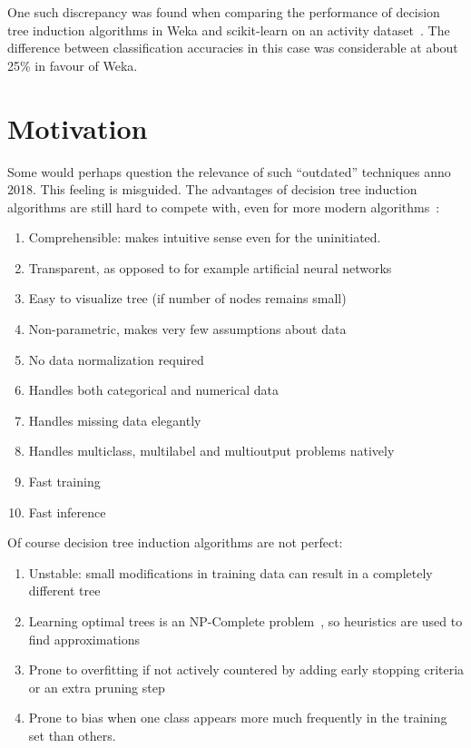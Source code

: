 One such discrepancy was found when comparing the performance of decision tree induction algorithms in Weka and scikit-learn on an activity dataset~\cite{problematic_dataset}. The difference between classification accuracies in this case was considerable at about 25\% in favour of Weka.

\section{Motivation}
Some would perhaps question the relevance of such ``outdated'' techniques anno 2018. This feeling is misguided. The advantages of decision tree induction algorithms are still hard to compete with, even for more modern algorithms~\cite{scikit-learn, murthy1998automatic, kotsiantis2007supervised}:

\begin{enumerate}
    \item Comprehensible: makes intuitive sense even for the uninitiated.
    \item Transparent, as opposed to for example artificial neural networks
    \item Easy to visualize tree (if number of nodes remains small)
    \item Non-parametric, makes very few assumptions about data
    \item No data normalization required
    \item Handles both categorical and numerical data
    \item Handles missing data elegantly %
    \item Handles multiclass, multilabel and multioutput problems natively
    \item Fast training
    \item Fast inference
\end{enumerate}

Of course decision tree induction algorithms are not perfect:
\begin{enumerate}
    \item Unstable: small modifications in training data can result in a completely different tree
    \item Learning optimal trees is an NP-Complete problem~\cite{npcomplete}, so heuristics are used to find approximations
    \item Prone to overfitting if not actively countered by adding early stopping criteria or an extra pruning step
    \item Prone to bias when one class appears more much frequently in the training set than others.
\end{enumerate}

